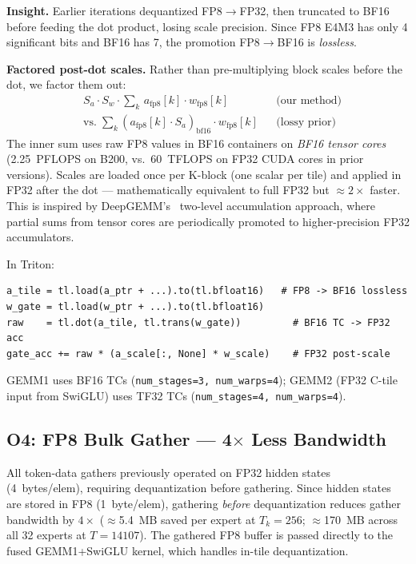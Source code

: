 \textbf{Insight.}
Earlier iterations dequantized FP8$\to$FP32, then truncated to BF16 before feeding the dot product, losing scale precision.
Since FP8 E4M3 has only 4 significant bits and BF16 has 7, the promotion FP8$\to$BF16 is \emph{lossless}.

\textbf{Factored post-dot scales.}
Rather than pre-multiplying block scales before the dot, we factor them out:
\begin{align*}
  &S_a \cdot S_w \cdot {\textstyle\sum}_k\, a_\mathrm{fp8}[k] \cdot w_\mathrm{fp8}[k]
   &&\text{(our method)}\\[-2pt]
  &\text{vs.}\;{\textstyle\sum}_k (a_\mathrm{fp8}[k]\cdot S_a)_{\mathrm{bf16}} \cdot w_\mathrm{fp8}[k]
   &&\text{(lossy prior)}
\end{align*}
The inner sum uses raw FP8 values in BF16 containers on \emph{BF16 tensor cores} (2.25~PFLOPS on B200, vs.\ 60~TFLOPS on FP32 CUDA cores in prior versions).
Scales are loaded once per K-block (one scalar per tile) and applied in FP32 after the dot --- mathematically equivalent to full FP32 but ${\approx}2\times$ faster.
This is inspired by DeepGEMM's~\cite{deepgemm} two-level accumulation approach, where partial sums from tensor cores are periodically promoted to higher-precision FP32 accumulators.

In Triton:
\begin{lstlisting}
a_tile = tl.load(a_ptr + ...).to(tl.bfloat16)   # FP8 -> BF16 lossless
w_gate = tl.load(w_ptr + ...).to(tl.bfloat16)
raw    = tl.dot(a_tile, tl.trans(w_gate))         # BF16 TC -> FP32 acc
gate_acc += raw * (a_scale[:, None] * w_scale)    # FP32 post-scale
\end{lstlisting}
GEMM1 uses BF16 TCs (\texttt{num\_stages=3, num\_warps=4});
GEMM2 (FP32 C-tile input from SwiGLU) uses TF32 TCs (\texttt{num\_stages=4, num\_warps=4}).

\subsection{O4: FP8 Bulk Gather --- 4$\times$ Less Bandwidth}

All token-data gathers previously operated on FP32 hidden states (4~bytes/elem), requiring dequantization before gathering.
Since hidden states are stored in FP8 (1~byte/elem), gathering \emph{before} dequantization reduces gather bandwidth by $4\times$ (${\approx}$5.4~MB saved per expert at $T_k{=}256$; ${\approx}$170~MB across all 32 experts at $T{=}14107$).
The gathered FP8 buffer is passed directly to the fused GEMM1+SwiGLU kernel, which handles in-tile dequantization.

